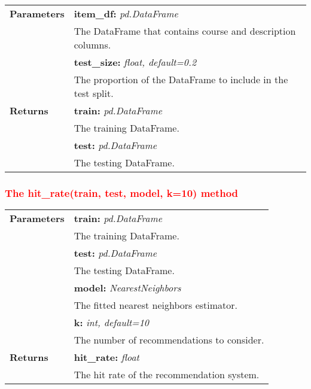 \vspace{-7mm}
\begin{table}[H]
\small
\begin{tabularx}{\textwidth}{|p{2cm}|X|}
\hline
\textbf{Parameters} & \textbf{item\_df:} \textit{pd.DataFrame} \\ & \hspace{5mm} The DataFrame that contains course and description columns. \\
& \textbf{test\_size:} \textit{float, default=0.2} \\ & \hspace{5mm} The proportion of the DataFrame to include in the test split. \\
\textbf{Returns} & \textbf{train:} \textit{pd.DataFrame} \\ & \hspace{5mm} The training DataFrame. \\
& \textbf{test:} \textit{pd.DataFrame} \\ & \hspace{5mm} The testing DataFrame. \\
\hline
\end{tabularx}
\end{table}

\subsubsection{\textcolor{red}{The hit\_rate(train, test, model, k=10) method}}

\vspace{-7mm}
\begin{table}[H]
\small
\begin{tabularx}{\textwidth}{|p{2cm}|X|}
\hline
\textbf{Parameters} & \textbf{train:} \textit{pd.DataFrame} \\ & \hspace{5mm} The training DataFrame. \\
& \textbf{test:} \textit{pd.DataFrame} \\ & \hspace{5mm} The testing DataFrame. \\
& \textbf{model:} \textit{NearestNeighbors} \\ & \hspace{5mm} The fitted nearest neighbors estimator. \\
& \textbf{k:} \textit{int, default=10} \\ & \hspace{5mm} The number of recommendations to consider. \\
\textbf{Returns} & \textbf{hit\_rate:} \textit{float} \\ & \hspace{5mm} The hit rate of the recommendation system. \\
\hline
\end{tabularx}
\end{table}

